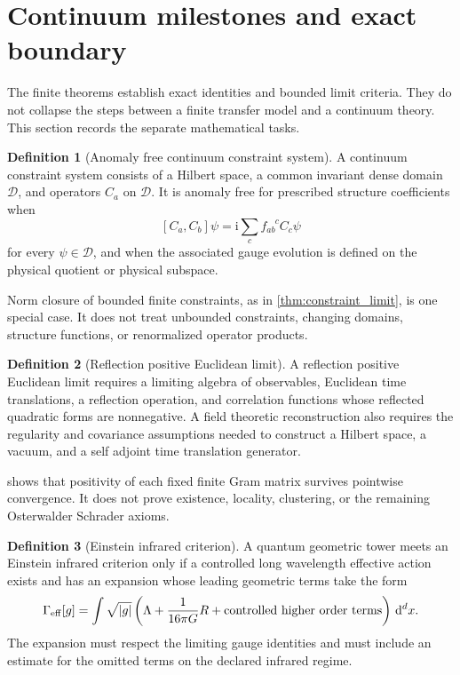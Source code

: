 \documentclass{aomart}
\theoremstyle{definition}
\newtheorem{definition}[definition]{Definition}
\theoremstyle{remark}
\newcommand{\Dcal}{\mathcal D}
\newcommand{\ii}{\mathrm i}
\newcommand{\dd}{\,\mathrm d}
\newcommand{\abs}[1]{\left\lvert#1\right\rvert}
\begin{document}
\section{Continuum milestones and exact boundary}\label{sec:boundary}

The finite theorems establish exact identities and bounded limit criteria. They do not collapse the steps between a finite transfer model and a continuum theory. This section records the separate mathematical tasks.

\begin{definition}[Anomaly free continuum constraint system]\label{def:anomaly_free_continuum}
A continuum constraint system consists of a Hilbert space, a common invariant dense domain \(\Dcal\), and operators \(C_a\) on \(\Dcal\). It is anomaly free for prescribed structure coefficients when
\[
[C_a,C_b]\psi
=
\ii\sum_cf_{ab}^{\phantom{ab}c}C_c\psi
\]
for every \(\psi\in\Dcal\), and when the associated gauge evolution is defined on the physical quotient or physical subspace.
\end{definition}

Norm closure of bounded finite constraints, as in \cref{thm:constraint_limit}, is one special case. It does not treat unbounded constraints, changing domains, structure functions, or renormalized operator products.

\begin{definition}[Reflection positive Euclidean limit]\label{def:reflection_positive_limit}
A reflection positive Euclidean limit requires a limiting algebra of observables, Euclidean time translations, a reflection operation, and correlation functions whose reflected quadratic forms are nonnegative. A field theoretic reconstruction also requires the regularity and covariance assumptions needed to construct a Hilbert space, a vacuum, and a self adjoint time translation generator.
\end{definition}

 shows that positivity of each fixed finite Gram matrix survives pointwise convergence. It does not prove existence, locality, clustering, or the remaining Osterwalder Schrader axioms.

\begin{definition}[Einstein infrared criterion]\label{def:einstein_criterion}
A quantum geometric tower meets an Einstein infrared criterion only if a controlled long wavelength effective action exists and has an expansion whose leading geometric terms take the form
\[
\Gamma_{\rm eff}[g]
=
\int
\sqrt{\abs g}
\left(
\Lambda
+
\frac{1}{16\pi G}R
+
\text{controlled higher order terms}
\right)
\dd^dx.
\]
The expansion must respect the limiting gauge identities and must include an estimate for the omitted terms on the declared infrared regime.
\end{definition}
\end{document}
